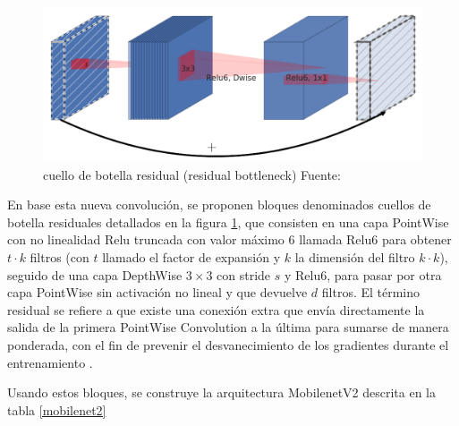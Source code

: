         	\begin{figure}[H]
        		\centering
        		\includegraphics[scale=0.25]{imagenes/bottleneck}
        		\caption[Cuello de botella residual]{cuello de botella residual (residual bottleneck) Fuente:\citep{8578572}}
        		\label{bottleneck}
        	\end{figure}
        	
        	En base esta nueva convolución, se proponen bloques denominados cuellos de botella residuales detallados en la figura \ref{bottleneck}, que consisten en una capa PointWise con no linealidad Relu truncada con valor máximo 6 llamada Relu6 para obtener $t\cdot k$ filtros (con $t$ llamado el factor de expansión y $k$ la dimensión del filtro $k\cdot k$), seguido de una capa DepthWise $3\times3$ con stride $s$ y Relu6, para pasar por otra capa PointWise sin activación no lineal y que devuelve $d$ filtros. El término residual se refiere a que existe una conexión extra que envía directamente la salida de la primera PointWise Convolution a la última para sumarse de manera ponderada, con el fin de prevenir el desvanecimiento de los gradientes durante el entrenamiento \citep{8578572}.
        	
        
        	Usando estos bloques, se construye la arquitectura MobilenetV2 descrita en la tabla \ref{mobilenet2}
        	
